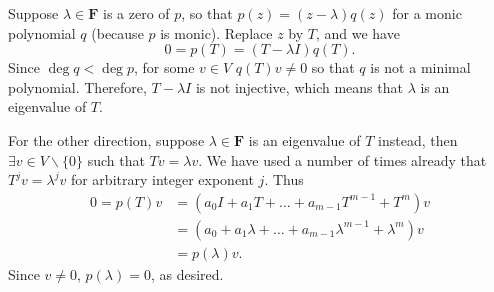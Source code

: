 \documentclass[11pt]{article}
\newcommand{\F}{\mathbf{F}}
\begin{document}
\begin{itemize}
    Suppose $\lambda \in \F$ is a zero of $p$, so that $p(z) = (z-\lambda)q(z)$ for a monic polynomial $q$ (because $p$ is monic). Replace $z$ by $T$, and we have \[0 = p(T) = (T - \lambda I)q(T).\] Since $\deg q < \deg p$, for some $v \in V$ $q(T)v \ne 0$ so that $q$ is not a minimal polynomial. Therefore, $T - \lambda I$ is not injective, which means that $\lambda$ is an eigenvalue of $T$.

    For the other direction, suppose $\lambda \in \F$ is an eigenvalue of $T$ instead, then $\exists v \in V\backslash \{0\}$ such that $Tv = \lambda v$. We have used a number of times already that $T^j v= \lambda^j v$ for arbitrary integer exponent $j$. Thus
    \begin{align*}
        0 = p(T)v & = (a_0 I + a_1 T + \dots + a_{m-1} T^{m-1} + T^m)v \\ & = (a_0 + a_1 \lambda + \dots + a_{m-1} \lambda^{m-1} + \lambda^m)v \\ & = p(\lambda) v.
    \end{align*}
    Since $v \ne 0$, $p(\lambda) = 0$, as desired.
\end{itemize}
\end{document}
